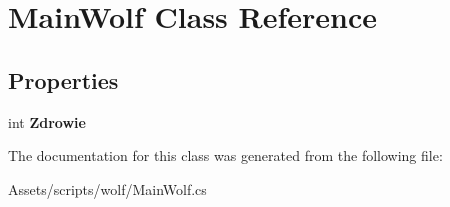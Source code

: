\hypertarget{class_main_wolf}{}\section{Main\+Wolf Class Reference}
\label{class_main_wolf}
\subsection*{Properties}
\begin{DoxyCompactItemize}
\item 
\mbox{\label{class_main_wolf_af2ea34ffb902eb1e7051af3e54ab475f}} 
int {\bfseries Zdrowie}
\end{DoxyCompactItemize}


The documentation for this class was generated from the following file\+:\begin{DoxyCompactItemize}
\item 
Assets/scripts/wolf/Main\+Wolf.\+cs\end{DoxyCompactItemize}
